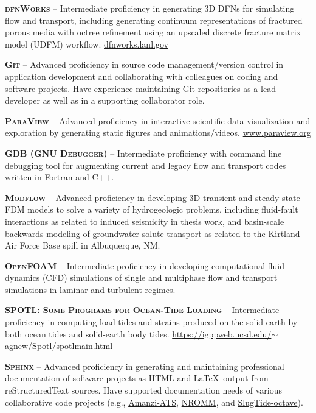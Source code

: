 \documentclass[11pt, letterpaper]{article}
\begin{document}
\textbf{\textsc{dfnWorks}} -- Intermediate proficiency in generating 3D
DFNs for simulating flow and transport, including
generating continuum representations of fractured porous media with octree
refinement using an upscaled discrete fracture matrix model (UDFM) workflow.
\href{https://dfnworks.lanl.gov}{dfnworks.lanl.gov}

\textbf{\textsc{Git}} -- Advanced proficiency in source code management/version control
in application development and collaborating with colleagues on coding and software
projects. Have experience maintaining Git repositories as a lead developer as
well as in a supporting collaborator role.

\textbf{\textsc{ParaView}} -- Advanced proficiency in interactive scientific
data visualization and exploration by generating static figures and
animations/videos. \href{https://www.paraview.org/}{www.paraview.org} 

\textbf{\textsc{GDB (GNU Debugger)}} -- Intermediate proficiency with command
line debugging tool for augmenting current and legacy flow and transport codes
written in Fortran and C++.

\textbf{\textsc{Modflow}} -- Advanced proficiency in developing 3D transient
and steady-state FDM models to solve a variety of hydrogeologic problems, 
including fluid-fault interactions as related to induced seismicity in thesis
work, and basin-scale backwards modeling of groundwater solute transport as
related to the Kirtland Air Force Base spill in Albuquerque, NM.

\textbf{\textsc{OpenFOAM}} -- Intermediate proficiency in developing
computational fluid dynamics (CFD) simulations of single and multiphase flow
and transport simulations in laminar and turbulent regimes.

\textbf{\textsc{SPOTL: Some Programs for Ocean-Tide Loading}} -- Intermediate
proficiency in computing load tides and strains produced on the solid earth by
both ocean tides and solid-earth body tides.
\href{https://igppweb.ucsd.edu/~agnew/Spotl/spotlmain.html}{https://igppweb.ucsd.edu/\(\sim \)agnew/Spotl/spotlmain.html}

\textbf{\textsc{Sphinx}} -- Advanced proficiency in generating and maintaining
professional documentation of software projects as HTML and \LaTeX \ output
from reStructuredText sources. Have supported documentation needs of various
collaborative code projects %
(e.g., \href{https://github.com/amanzi/amanzi}{Amanzi-ATS},
\href{https://gitlab.lanl.gov/jportiz/nromm_user_guide}{NROMM}, and
\href{https://github.com/johnportiz14/SlugTide-octave}{SlugTide-octave}).
\end{document}

